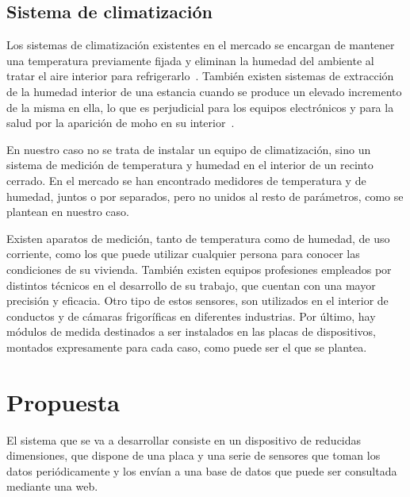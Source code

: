 \subsection{Sistema de climatización}\label{subsec:sistema-de-climatización}
Los sistemas de climatización existentes en el mercado se encargan de mantener una temperatura previamente fijada y eliminan la humedad del ambiente al tratar el aire interior para refrigerarlo~\cite{ruiz_sistemas_nodate}. También existen sistemas de extracción de la humedad interior de una estancia cuando se produce un elevado incremento de la misma en ella, lo que es perjudicial para los equipos electrónicos y para la salud por la aparición de moho en su interior~\cite{murprotec_calidad_nodate}.

En nuestro caso no se trata de instalar un equipo de climatización, sino un sistema de medición de temperatura y humedad en el interior de un recinto cerrado. En el mercado se han encontrado medidores de temperatura y de humedad, juntos o por separados, pero no unidos al resto de parámetros, como se plantean en nuestro caso.

Existen aparatos de medición, tanto de temperatura como de humedad, de uso corriente, como los que puede utilizar cualquier persona para conocer las condiciones de su vivienda. También existen equipos profesiones empleados por distintos técnicos en el desarrollo de su trabajo, que cuentan con una mayor precisión y eficacia. Otro tipo de estos sensores, son utilizados en el interior de conductos y de cámaras frigoríficas en diferentes industrias. Por último, hay módulos de medida destinados a ser instalados en las placas de dispositivos, montados expresamente para cada caso, como puede ser el que se plantea.

\section{Propuesta}\label{sec:propuesta}
El sistema que se va a desarrollar consiste en un dispositivo de reducidas dimensiones, que dispone de una placa y una serie de sensores que toman los datos periódicamente y los envían a una base de datos que puede ser consultada mediante una web.

